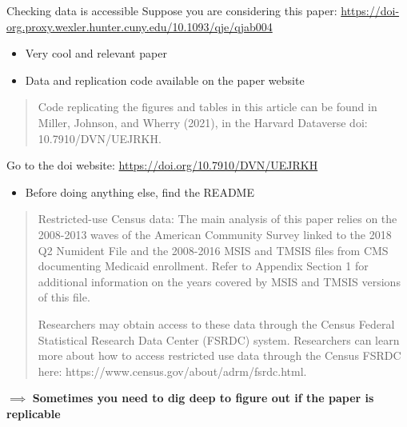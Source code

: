 \documentclass[compress, 8pt]{beamer}
\begin{document}
\begin{frame}{Checking data is accessible}
Suppose you are considering this paper: \url{https://doi-org.proxy.wexler.hunter.cuny.edu/10.1093/qje/qjab004}
\begin{itemize}
    \item Very cool and relevant paper
    \item Data and replication code available on the paper website
\end{itemize}
\begin{quote}
    Code replicating the figures and tables in this article can be found in Miller, Johnson, and Wherry (2021), in the Harvard Dataverse doi: 10.7910/DVN/UEJRKH.
\end{quote}
Go to the doi website: \url{https://doi.org/10.7910/DVN/UEJRKH}
\begin{itemize}
\item Before doing anything else, find the README
\end{itemize}

\begin{quote}
    Restricted-use Census data: The main analysis of this paper relies on the 2008-2013 waves of the American Community Survey linked to the 2018 Q2 Numident File and the 2008-2016 MSIS and TMSIS files from CMS documenting Medicaid enrollment. Refer to Appendix Section 1 for additional information on the years covered by MSIS and TMSIS versions of this file. 

    \vspace{2ex}
Researchers may obtain access to these data through the Census Federal Statistical Research Data Center (FSRDC) system. Researchers can learn more about how to access restricted use data through the Census FSRDC here: https://www.census.gov/about/adrm/fsrdc.html.
\end{quote}

$\implies$ \textbf{Sometimes you need to dig deep to figure out if the paper is replicable}

\end{frame}
\end{document}
